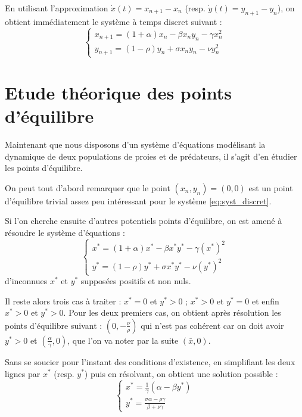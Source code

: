 En utilisant l'approximation $\dot{x}(t) = x_{n+1} - x_n$ (resp. $\dot{y}(t) = y_{n+1} - y_n$), on obtient immédiatement le système à temps discret suivant :
\begin{equation}
    \label{eq:syst_discret}
    \begin{cases}
        x_{n+1} = (1 + \alpha) x_n - \beta x_n y_n - \gamma x_n^2 \\
        y_{n+1} = (1 - \rho) y_n + \sigma x_n y_n - \nu y_n^2
    \end{cases}
\end{equation}


\section{Etude théorique des points d'équilibre}

Maintenant que nous disposons d'un système d'équations modélisant la dynamique de deux populations de proies et de prédateurs, il s'agit d'en étudier les points d'équilibre.

On peut tout d'abord remarquer que le point $(x_n, y_n) = (0, 0)$ est un point d'équilibre trivial assez peu intéressant pour le système \ref{eq:syst_discret}.

Si l'on cherche ensuite d'autres potentiels points d'équilibre, on est amené à résoudre le système d'équations :
\begin{equation}
    \begin{cases}
        x^* = (1 + \alpha) x^* - \beta x^* y^* - \gamma (x^*)^2 \\
        y^* = (1 - \rho) y^* + \sigma x^* y^* - \nu (y^*)^2
    \end{cases}
\end{equation}
d'inconnues $x^*$ et $y^*$ supposées positifs et non nuls.

Il reste alors trois cas à traiter : $x^* = 0$ et $y^* > 0$ ; $x^* > 0$ et $y^* = 0$ et enfin $x^* > 0$ et $y^* > 0$.
Pour les deux premiers cas, on obtient après résolution les points d'équilibre suivant : $(0, - \frac{\nu}{\rho})$ qui n'est pas cohérent car on doit avoir $y^* > 0$ et $(\frac{\alpha}{\gamma}, 0)$, que l'on va noter par la suite $(\bar{x}, 0)$.

Sans se soucier pour l'instant des conditions d'existence, en simplifiant les deux lignes par $x^*$ (resp. $y^*$) puis en résolvant, on obtient une solution possible :
\begin{equation}
    \label{eq:equilibre}
    \begin{cases}
        x^* = \frac{1}{\gamma} (\alpha - \beta y^*) \\
        y^* = \frac{\sigma \alpha - \rho \gamma}{\beta + \nu \gamma}
    \end{cases}
\end{equation}

